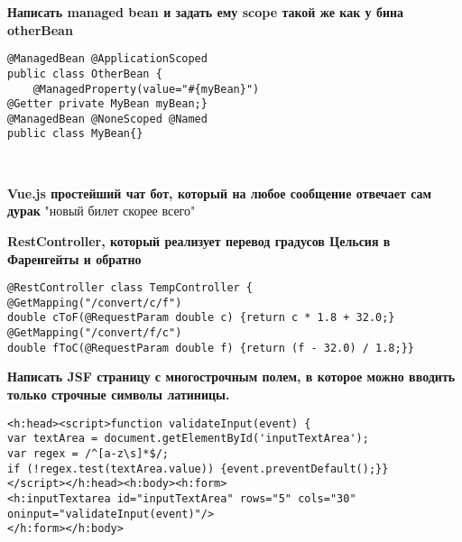 \documentclass{article}
\begin{document}
\hfill
\begin{minipage}[t]{0.3\textwidth}
    \textbf{Написать managed bean и задать ему scope такой же как у бина otherBean}
    \begin{lstlisting}[frame=single, basicstyle=\tiny\ttfamily, breaklines=true, breakatwhitespace=true, postbreak=\mbox{\textcolor{red}{$\hookrightarrow$}\space}]
@ManagedBean @ApplicationScoped
public class OtherBean {
    @ManagedProperty(value="#{myBean}")
@Getter private MyBean myBean;}
@ManagedBean @NoneScoped @Named
public class MyBean{}
    \end{lstlisting}
\end{minipage}%
\\

\begin{minipage}[t]{0.3\textwidth}
    \textbf{Vue.js простейший чат бот, который на любое сообщение отвечает сам дурак}
"новый билет скорее всего"
\end{minipage}%
\hfill
\begin{minipage}[t]{0.3\textwidth}
    \textbf{RestController, который реализует перевод градусов Цельсия в Фаренгейты и обратно}
    \begin{lstlisting}[frame=single, basicstyle=\tiny\ttfamily, breaklines=true, breakatwhitespace=true, postbreak=\mbox{\textcolor{red}{$\hookrightarrow$}\space}]
@RestController class TempController {
@GetMapping("/convert/c/f")
double cToF(@RequestParam double c) {return c * 1.8 + 32.0;}
@GetMapping("/convert/f/c")
double fToC(@RequestParam double f) {return (f - 32.0) / 1.8;}}
    \end{lstlisting}
\end{minipage}%
\hfill
\begin{minipage}[t]{0.3\textwidth}
    \textbf{Написать JSF страницу с многострочным полем, в которое можно вводить только строчные символы латиницы.}
    \begin{lstlisting}[frame=single, basicstyle=\tiny\ttfamily, breaklines=true, breakatwhitespace=true, postbreak=\mbox{\textcolor{red}{$\hookrightarrow$}\space}]
<h:head><script>function validateInput(event) {
var textArea = document.getElementById('inputTextArea');
var regex = /^[a-z\s]*$/;
if (!regex.test(textArea.value)) {event.preventDefault();}}
</script></h:head><h:body><h:form>
<h:inputTextarea id="inputTextArea" rows="5" cols="30" oninput="validateInput(event)"/>
</h:form></h:body>
    \end{lstlisting}
\end{minipage}%
\\
\end{document}
